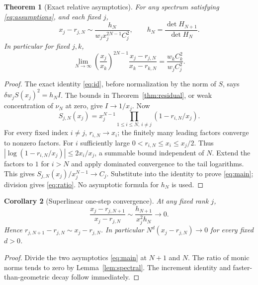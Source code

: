 \documentclass[11pt]{article}
\newtheorem{theorem}{Theorem}[section]
\newtheorem{corollary}[theorem]{Corollary}
\theoremstyle{remark}\newtheorem{remark}[theorem]{Remark}
\begin{document}
\begin{theorem}[Exact relative asymptotics]\label{thm:main}
For any spectrum satisfying \eqref{eq:assumptions}, and each fixed $j$,
\begin{equation}\label{eq:main}
 \boxed{x_j-r_{j,N}\sim\frac{h_N}{w_j x_j^{2N-1}C_j^2},\qquad
 h_N=\frac{\det H_{N+1}}{\det H_N}.}
\end{equation}
In particular for fixed $j,k$,
\begin{equation}\label{eq:ratio}
 \lim_{N\to\infty}\left(\frac{x_j}{x_k}\right)^{2N-1}
 \frac{x_j-r_{j,N}}{x_k-r_{k,N}}=\frac{w_k C_k^2}{w_j C_j^2}.
\end{equation}
\end{theorem}
\begin{proof}
The exact identity \eqref{eq:id}, before normalization by the norm of $S$, says $\delta w_jS(x_j)^2=h_N I$. The bounds in Theorem~\ref{thm:residual}, or weak concentration of $\nu_N$ at zero, give $I\to1/x_j$. Now
\[
 S_{j,N}(x_j)=x_j^{N-1}\prod_{1\le i\le N,\ i\ne j}(1-r_{i,N}/x_j).
\]
For every fixed index $i\ne j$, $r_{i,N}\to x_i$; the finitely many leading factors converge to nonzero factors. For $i$ sufficiently large $0<r_{i,N}\le x_i\le x_j/2$. Thus $|\log(1-r_{i,N}/x_j)|\le2x_i/x_j$, a summable bound independent of $N$. Extend the factors to $1$ for $i>N$ and apply dominated convergence to the tail logarithms. This gives $S_{j,N}(x_j)/x_j^{N-1}\to C_j$. Substitute into the identity to prove \eqref{eq:main}; division gives \eqref{eq:ratio}. No asymptotic formula for $h_N$ is used.
\end{proof}

\begin{corollary}[Superlinear one-step convergence]\label{cor:step}
At any fixed rank $j$,
\begin{equation}\label{eq:step}
 \frac{x_j-r_{j,N+1}}{x_j-r_{j,N}}\sim\frac{h_{N+1}}{x_j^2h_N}\to0.
\end{equation}
Hence $r_{j,N+1}-r_{j,N}\sim x_j-r_{j,N}$. In particular $N^d(x_j-r_{j,N})\to0$ for every fixed $d>0$.
\end{corollary}
\begin{proof}
Divide the two asymptotics \eqref{eq:main} at $N+1$ and $N$. The ratio of monic norms tends to zero by Lemma~\ref{lem:spectral}. The increment identity and faster-than-geometric decay follow immediately.
\end{proof}
\end{document}
